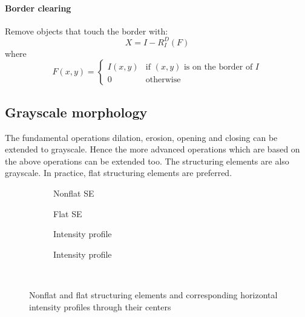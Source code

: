 \paragraph{Border clearing}

Remove objects that touch the border with:
\[
	X = I - R_I^D(F)
\]
where
\[
	F(x,y) = \begin{cases}
			I(x,y) & \text{if $(x,y)$ is on the border of $I$} \\
			0 & \text{otherwise}
	\end{cases}
\]

\subsection{Grayscale morphology}

The fundamental operations dilation, erosion, opening and closing can be extended to grayscale. Hence the more advanced operations which are based on the above operations can be extended too. The structuring elements are also grayscale. In practice, flat structuring elements are preferred.

\begin{figure}[h!]
	\centering
	\begin{subfigure}{.45\linewidth}
		\centering
		\caption{Nonflat SE}
	\end{subfigure}
	\begin{subfigure}{.45\linewidth}
		\centering
		\caption{Flat SE}
	\end{subfigure}
	\begin{subfigure}{.45\linewidth}
		\centering
		\caption{Intensity profile}
	\end{subfigure}
	\begin{subfigure}{.45\linewidth}
		\centering
		\caption{Intensity profile}
	\end{subfigure}\\
	\caption{Nonflat and flat structuring elements and corresponding horizontal intensity profiles through their centers}
\end{figure}


